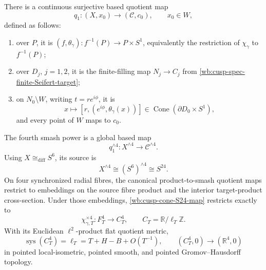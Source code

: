 \begin{theorem}
There is a continuous surjective based quotient map
\begin{equation}
 q_1:(X,x_0)\longrightarrow(\mathcal C,c_0),\qquad x_0\in W,
 \label{wb:cusp-cone-q1}
\end{equation}
defined as follows:
\begin{enumerate}
\item over \(P\), it is
\((f,\theta_\gamma):f^{-1}(P)\to P\times S^1\), equivalently the
restriction of \(\chi_\gamma\) to \(f^{-1}(P)\);
\item over \(D_j\), \(j=1,2\), it is the finite-filling map
\(N_j\to C_j\) from \cref{wb:cusp-spec-finite-Seifert-target};
\item on \(N_0\setminus W\), writing \(t=re^{i\phi}\), it is
\begin{equation}
 x\longmapsto[r,(e^{i\phi},\theta_\gamma(x))]
 \in\operatorname{Cone}(\partial D_0\times S^1),
 \label{wb:cusp-cone-q1-cusp-formula}
\end{equation}
and every point of \(W\) maps to \(c_0\).
\end{enumerate}
The fourth smash power is a global based map
\begin{equation}
 q_1^{\wedge4}:X^{\wedge4}\longrightarrow\mathcal C^{\wedge4}.
 \label{wb:cusp-cone-S24-map}
\end{equation}
Using \(X\cong_{\mathrm{diff}}S^6\), its source is
\begin{equation}
 X^{\wedge4}\cong(S^6)^{\wedge4}\cong S^{24}.
 \label{wb:cusp-cone-S24-source}
\end{equation}
On four synchronized radial fibres, the canonical product-to-smash quotient
maps restrict to embeddings on the source fibre product and the interior
target-product cross-section.  Under those embeddings,
\cref{wb:cusp-cone-S24-map} restricts exactly to
\begin{equation}
 \chi_{\gamma,T}^{\times4}:F_T^4\longrightarrow C_T^4,\qquad
 C_T=\mathbb R/\ell_T\mathbb Z.
 \label{wb:cusp-cone-S24-fibre-map}
\end{equation}
With its Euclidean \(\ell^2\)-product flat quotient metric,
\begin{equation}
 \operatorname{sys}(C_T^4)=\ell_T
 =T+H-B+O(T^{-1}),\qquad
 (C_T^4,0)\longrightarrow(\mathbb R^4,0)
 \label{wb:cusp-cone-S24-R4-limit}
\end{equation}
in pointed local-isometric, pointed smooth, and pointed
Gromov--Hausdorff topology.


\end{theorem}

